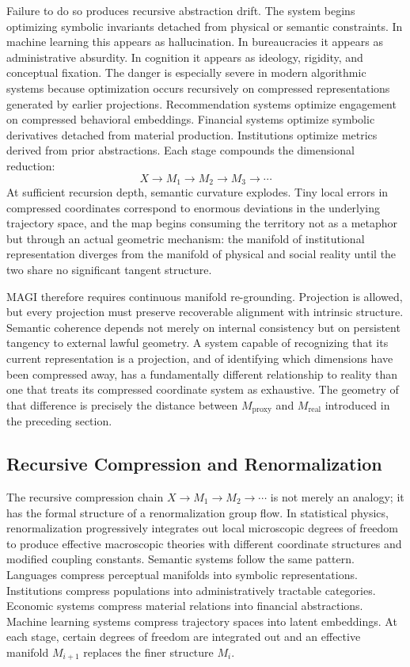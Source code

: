 \documentclass[11pt,a4paper,twocolumn]{article}
\begin{document}
Failure to do so produces recursive abstraction drift. The
system begins optimizing symbolic invariants detached from
physical or semantic constraints. In machine learning this
appears as hallucination. In bureaucracies it appears as
administrative absurdity. In cognition it appears as
ideology, rigidity, and conceptual fixation. The danger is
especially severe in modern algorithmic systems because
optimization occurs recursively on compressed representations
generated by earlier projections. Recommendation systems
optimize engagement on compressed behavioral embeddings.
Financial systems optimize symbolic derivatives detached
from material production. Institutions optimize metrics
derived from prior abstractions. Each stage compounds the
dimensional reduction:
\[
X \to M_1 \to M_2 \to M_3 \to \cdots
\]
At sufficient recursion depth, semantic curvature explodes.
Tiny local errors in compressed coordinates correspond to
enormous deviations in the underlying trajectory space, and
the map begins consuming the territory not as a metaphor but
through an actual geometric mechanism: the manifold of
institutional representation diverges from the manifold of
physical and social reality until the two share no significant
tangent structure.

MAGI therefore requires continuous manifold re-grounding.
Projection is allowed, but every projection must preserve
recoverable alignment with intrinsic structure. Semantic
coherence depends not merely on internal consistency but on
persistent tangency to external lawful geometry. A system
capable of recognizing that its current representation is
a projection, and of identifying which dimensions have been
compressed away, has a fundamentally different relationship
to reality than one that treats its compressed coordinate
system as exhaustive. The geometry of that difference is
precisely the distance between $M_{\mathrm{proxy}}$ and
$M_{\mathrm{real}}$ introduced in the preceding section.

\subsection{Recursive Compression and Renormalization}

The recursive compression chain $X \to M_1 \to M_2 \to \cdots$
is not merely an analogy; it has the formal structure of a
renormalization group flow. In statistical physics, renormalization
progressively integrates out local microscopic degrees of freedom
to produce effective macroscopic theories with different coordinate
structures and modified coupling constants. Semantic systems follow
the same pattern. Languages compress perceptual manifolds into
symbolic representations. Institutions compress populations into
administratively tractable categories. Economic systems compress
material relations into financial abstractions. Machine learning
systems compress trajectory spaces into latent embeddings. At each
stage, certain degrees of freedom are integrated out and an effective
manifold $M_{i+1}$ replaces the finer structure $M_i$.
\end{document}

